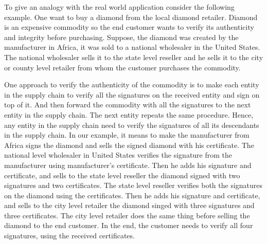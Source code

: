 To give an analogy with the real world application consider the following example.
One want to buy a diamond from the local diamond retailer.
Diamond is an expensive commodity so the end customer wants to verify its authenticity and integrity before purchasing.
Suppose, the diamond was created by the manufacturer in Africa, it was sold to a national wholesaler in the United States. 
The national wholesaler sells it to the state level reseller and he sells it to the city or county level retailer from whom the customer purchases the commodity.

One approach to verify the authenticity of the commodity is to make each entity in the supply chain to verify all the signatures on the received entity and sign on top of it.
And then forward the commodity with all the signatures to the next entity in the supply chain.
The next entity repeats the same procedure.
Hence, any entity in the supply chain need to verify the signatures of all its descendants in the supply chain.
In our example, it means to make the manufacturer from Africa signs the diamond and sells the signed diamond with his certificate.
The national level wholesaler in United States verifies the signature from the manufacturer using manufacturer's certificate.
Then he adds his signature and certificate, and sells to the state level reseller the diamond signed with two signatures and two certificates.
The state level reseller verifies both the signatures on the diamond using the certificates.
Then he adds his signature and certificate, and sells to the city level retailer the diamond singed with three signatures and three certificates. 
The city level retailer does the same thing before selling the diamond to the end customer.
In the end, the customer needs to verify all four signatures, using the received certificates.


